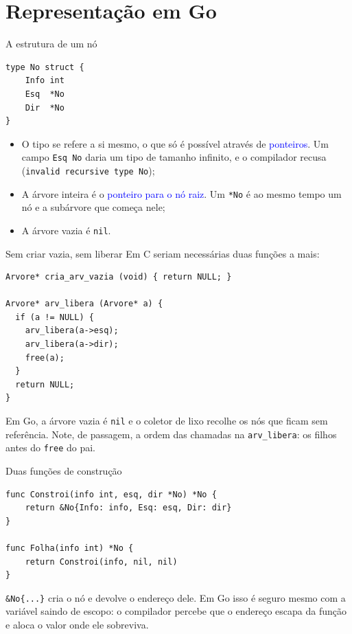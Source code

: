 \documentclass{beamer}
\newcommand{\tcb}[1]{\textcolor{blue}{#1}}
\begin{document}
\section{Representação em Go}

\begin{frame}[fragile]{A estrutura de um nó}
  \begin{verbatim}
type No struct {
    Info int
    Esq  *No
    Dir  *No
}
  \end{verbatim}

  \vspace{0.3cm}
  \begin{itemize}
    \item O tipo se refere a si mesmo, o que só é possível através de
          \tcb{ponteiros}. Um campo \texttt{Esq No} daria um tipo de tamanho
          infinito, e o compilador recusa
          (\texttt{invalid recursive type No});
    \item A árvore inteira é o \tcb{ponteiro para o nó raiz}. Um \texttt{*No} é
          ao mesmo tempo um nó e a subárvore que começa nele;
    \item A árvore vazia é \texttt{nil}.
  \end{itemize}
\end{frame}

\begin{frame}[fragile]{Sem criar vazia, sem liberar}
  Em C seriam necessárias duas funções a mais:

  \begin{verbatim}
Arvore* cria_arv_vazia (void) { return NULL; }

Arvore* arv_libera (Arvore* a) {
  if (a != NULL) {
    arv_libera(a->esq);
    arv_libera(a->dir);
    free(a);
  }
  return NULL;
}
  \end{verbatim}

  \vspace{0.2cm}
  Em Go, a árvore vazia é \texttt{nil} e o coletor de lixo recolhe os nós que
  ficam sem referência. \footnotesize Note, de passagem, a ordem das chamadas na
  \texttt{arv\_libera}: os filhos antes do \texttt{free} do pai.
\end{frame}

\begin{frame}[fragile]{Duas funções de construção}
  \begin{verbatim}
func Constroi(info int, esq, dir *No) *No {
    return &No{Info: info, Esq: esq, Dir: dir}
}

func Folha(info int) *No {
    return Constroi(info, nil, nil)
}
  \end{verbatim}

  \vspace{0.3cm}
  \texttt{\&No\{...\}} cria o nó e devolve o endereço dele. Em Go isso é seguro
  mesmo com a variável saindo de escopo: o compilador percebe que o endereço
  escapa da função e aloca o valor onde ele sobreviva.
\end{frame}
\end{document}
